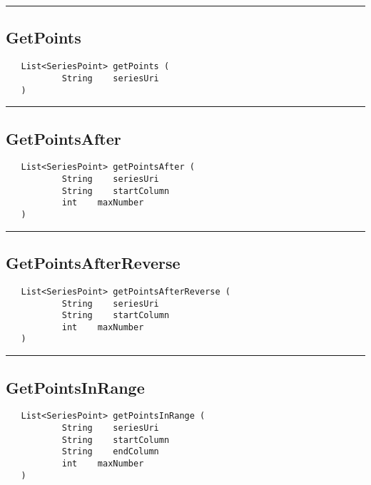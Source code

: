 \rule{15cm}{2pt}
\subsection{GetPoints}
\label{Api:GetPoints}
\begin{verbatim}
   List<SeriesPoint> getPoints (
           String    seriesUri
   )
\end{verbatim}



\rule{15cm}{2pt}
\subsection{GetPointsAfter}
\label{Api:GetPointsAfter}
\begin{verbatim}
   List<SeriesPoint> getPointsAfter (
           String    seriesUri
           String    startColumn
           int    maxNumber
   )
\end{verbatim}



\rule{15cm}{2pt}
\subsection{GetPointsAfterReverse}
\label{Api:GetPointsAfterReverse}
\begin{verbatim}
   List<SeriesPoint> getPointsAfterReverse (
           String    seriesUri
           String    startColumn
           int    maxNumber
   )
\end{verbatim}



\rule{15cm}{2pt}
\subsection{GetPointsInRange}
\label{Api:GetPointsInRange}
\begin{verbatim}
   List<SeriesPoint> getPointsInRange (
           String    seriesUri
           String    startColumn
           String    endColumn
           int    maxNumber
   )
\end{verbatim}



